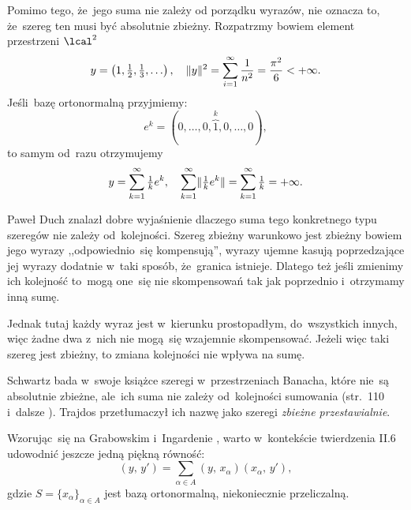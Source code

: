 \documentclass[a4paper,11pt]{article}
\numberwithin{equation}{section}
\begin{document}
Pomimo tego, że~jego suma nie zależy od porządku wyrazów, nie oznacza
to, że~szereg ten musi być absolutnie zbieżny. Rozpatrzmy bowiem
element przestrzeni $\lcal^{ 2 }$
\begin{equation}
  \label{eq:RS-Vol-I-s01-20}
  y = \left( 1, \tfrac{ 1 }{ 2 }, \tfrac{ 1 }{ 3 }, \ldots \right), \quad
  \lVert{  y  }\rVert^{ 2 }
  = \sum_{ i = 1 }^{ \infty } \frac{ 1 }{ n^{ 2 } }
  = \frac{ \pi^{ 2 } }{ 6 } < +\infty.
\end{equation}
Jeśli~bazę ortonormalną przyjmiemy:
\begin{equation}
  \label{eq:RS-Vol-I-s01-21}
  e^{ k } = ( 0, \ldots, 0, \overbrace{ 1 }^{ k }, 0, \ldots, 0),
\end{equation}
to samym od~razu otrzymujemy
\begin{equation}
  \label{eq:RS-Vol-I-s01-22}
  y =
  \sum_{ k = 1 }^{ \infty } \tfrac{ 1 }{ k } e^{ k }, \quad
  \sum_{ k = 1 }^{ \infty } \lVert{  \tfrac{ 1 }{ k } e^{ k }  }\rVert
  = \sum_{ k = 1 }^{ \infty } \tfrac{ 1 }{ k } = +\infty.
\end{equation}

Paweł Duch znalazł dobre wyjaśnienie dlaczego suma tego konkretnego
typu szeregów nie zależy od~kolejności. Szereg zbieżny warunkowo jest
zbieżny bowiem jego wyrazy ,,odpowiednio~się kompensują'', wyrazy
ujemne kasują poprzedzające jej wyrazy dodatnie w~taki sposób,
że~granica istnieje. Dlatego też jeśli zmienimy ich kolejność to~mogą
one~się nie skompensowań tak jak poprzednio i~otrzymamy inną sumę.

Jednak tutaj każdy wyraz jest w~kierunku prostopadłym, do~wszystkich
innych, więc żadne dwa z~nich nie mogą~się wzajemnie skompensować.
Jeżeli więc taki szereg jest zbieżny, to zmiana kolejności nie wpływa
na sumę.

Schwartz bada w~swoje książce szeregi w~przestrzeniach Banacha, które
nie~są absolutnie zbieżne, ale~ich suma nie zależy od~kolejności
sumowania (str.~110 i~dalsze
\cite{SchwartzKursAnalizyMatematycznejVolI1979}). Trajdos przetłumaczył ich
nazwę jako szeregi \textit{zbieżne przestawialnie}. %

\VerSpaceFour



\noindent
{} Wzorując~się na Grabowskim i~Ingardenie
\cite{GrabowskiIngardenMechanikaKwantowa1987}, warto w~kontekście
twierdzenia II.6 udowodnić jeszcze jedną piękną równość:
\begin{equation}
  \label{eq:RS-Vol-I-s01-23}
  ( y, \, y' ) =
  \sum_{ \alpha \in A } ( y, \, x_{ \alpha } ) ( x_{ \alpha }, \, y' ),
\end{equation}
gdzie $S = \{ x_{ \alpha } \}_{ \alpha \in A }$ jest bazą ortonormalną,
niekoniecznie przeliczalną.
\end{document}
